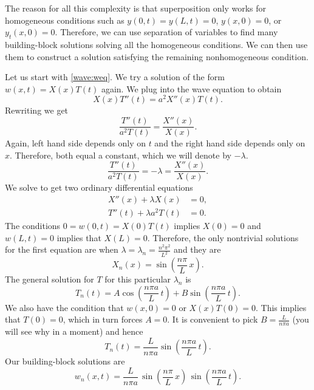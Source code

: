 \documentclass[12pt]{book}
\begin{document}
The reason for all this complexity is that superposition only works for
homogeneous conditions such as
$y(0,t) = y(L,t) = 0$, $y(x,0) = 0$, or $y_t(x,0) = 0$.  Therefore,
we can
use separation of variables to find many building-block
solutions solving all the homogeneous conditions.  We can then use them to
construct a solution satisfying the remaining nonhomogeneous condition.

Let us start with \eqref{wave:weq}.
We try a solution of the form $w(x,t) = X(x) T(t)$ again.  We plug into
the wave equation to obtain
\begin{equation*}
X(x)T''(t) = a^2 X''(x) T(t) .
\end{equation*}
Rewriting we get
\begin{equation*}
\frac{T''(t)}{a^2 T(t)} = \frac{X''(x)}{X(x)} .
\end{equation*}
Again, left hand side depends only on $t$ and the right hand side depends
only on $x$.  Therefore, both equal a constant, which we will denote by
$-\lambda$.
\begin{equation*}
\frac{T''(t)}{a^2 T(t)} = -\lambda = \frac{X''(x)}{X(x)} .
\end{equation*}
We solve to get two ordinary differential equations
\begin{align*}
X''(x) + \lambda X(x) &= 0 , \\
T''(t) + \lambda a^2 T(t) &= 0 .
\end{align*}
The conditions $0 = w(0,t) = X(0) T(t)$ implies $X(0) = 0$ and
$w(L,t) = 0$ implies that $X(L) = 0$.  Therefore, the only nontrivial
solutions for the first equation are when
$\lambda = \lambda_n = \frac{n^2 \pi^2}{L^2}$ and they are
\begin{equation*}
X_n(x) = \sin \left( \frac{n \pi}{L} \, x \right) .
\end{equation*}
The general solution for $T$ for this particular $\lambda_n$ is
\begin{equation*}
T_n(t) = A \cos \left( \frac{n \pi a}{L} \, t \right)
+ B \sin \left( \frac{n \pi a}{L} \, t \right).
\end{equation*}
We also have the condition that $w(x,0) = 0$ or $X(x)T(0) = 0$.  This
implies that $T(0) = 0$, which in turn forces $A = 0$.  It is
convenient to pick $B=\frac{L}{n \pi a}$ (you will see why in a moment)
and hence
\begin{equation*}
T_n(t) = \frac{L}{n \pi a} \sin \left( \frac{n \pi a}{L} \, t \right).
\end{equation*}
Our building-block solutions are
\begin{equation*}
w_n(x,t) = 
\frac{L}{n \pi a} \,
\sin \left( \frac{n \pi}{L} \, x \right) \,
\sin \left( \frac{n \pi a}{L} \, t \right) .
\end{equation*}
\end{document}
